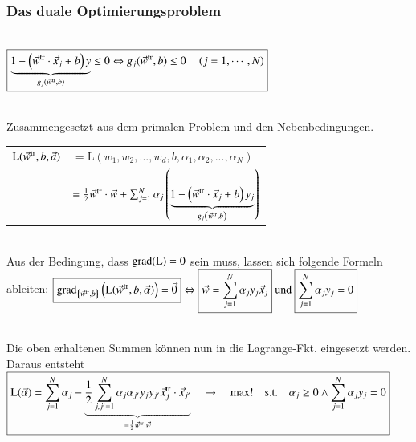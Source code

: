 \subsubsection{Das duale Optimierungsproblem}
\\
$\boxed{\underbrace{1-\left(\vec{w}^{\operatorname{tr}}\cdot\vec{x}_j+b\right)y}_{g_j(\vec{w}^{\operatorname{tr}},b)}\leq0\Leftrightarrow g_j(\vec{w}^{\operatorname{tr}},b)\leq0\quad\left(j=1,\cdots,N\right)}$
\medskip

\\
Zusammengesetzt aus dem primalen Problem und den Nebenbedingungen.\\
\begin{tabular}{|r@{ }l|}
    \hline
    $\mathrm{L}(\vec{w}^{\operatorname{tr}},b,\vec{a})$ & $ =\mathrm{L}(w_1,w_2, ...,w_d,b,\alpha_1,\alpha_2, ...,\alpha_N) $ \\
                                & $ =\frac12\vec{w}^{\operatorname{tr}}\cdot\vec{w}+\sum_{j=1}^N\alpha_j\left(\underbrace{1-\left(\vec{w}^{\operatorname{tr}}\cdot\vec{x}_j+b\right)y_j}_{g_j\left(\vec{w}^{\operatorname{tr}},b\right)}\right) $ \\
    \hline
\end{tabular}
\medskip

\\
Aus der Bedingung, dass $\operatorname{grad}(\mathrm{L}) = 0$ sein muss, lassen sich folgende Formeln ableiten:
$\boxed{\operatorname{grad}_{\left\{\vec{w}^{\operatorname{tr}},b\right\}}\left(\mathrm{L}(\vec{w}^{\operatorname{tr}},b,\vec{\alpha})\right)=\vec{0}} \Leftrightarrow 
\boxed{\vec{w}=\sum_{j=1}^N\alpha_jy_j\vec{x}_j} \text{ und }
\boxed{\sum_{j=1}^N\alpha_jy_j=0}$

\\
Die oben erhaltenen Summen können nun in die Lagrange-Fkt. eingesetzt werden. Daraus entsteht\\
$\boxed{\mathrm{L}(\vec{\alpha})=\sum_{j=1}^N\alpha_j-\underbrace{\frac12\sum_{j,j'=1}^N\alpha_j\alpha_{j'} \space y_jy_{j'} \space \vec{x}_j^{\operatorname{tr}}\cdot\vec{x}_{j'}}_{=\frac12 \vec{w}^{\operatorname{tr}} \cdot \vec{w}}\quad\to\quad\max!\quad\mathrm{s.t.}\quad\alpha_j\geq0\wedge\sum_{j=1}^N\alpha_jy_j=0}$

